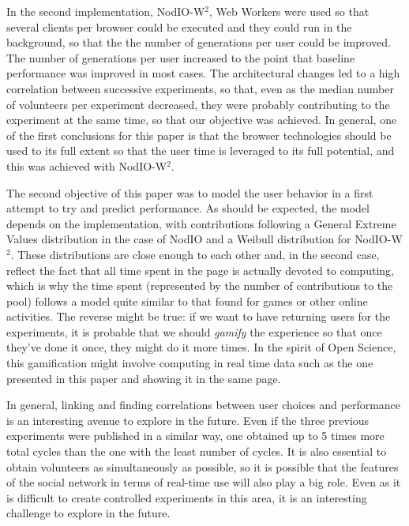 \documentclass[journal,onecolumn]{IEEEtran}
\begin{document}
In the second implementation, {\sf NodIO-W$^2$}, Web Workers
were used so that several clients per browser could be executed and
they could run in the background, so that the the number of
generations per user could be improved. The number of generations per
user increased to the point that baseline performance was improved in
most cases. The architectural changes led to a high correlation
between successive experiments, so that, even as the median number of
volunteers per experiment decreased, they were probably contributing
to the experiment at the same time, so that our objective was
achieved. In general, one of the first conclusions for this paper is
that the browser technologies should be used to its full extent so
that the user time is leveraged to its full potential, and this was
achieved with {\sf NodIO-W$^2$}. 

The second objective of this paper was to model the user behavior in a
first attempt to try and predict performance. As should be expected,
the model depends on the implementation, with contributions following
a General Extreme Values distribution in the case of {\sf NodIO} and a
Weibull distribution for {\sf NodIO-W$^2$}. These distributions are
close enough to each other and, in the second case, reflect the fact
that all time spent in the page is actually devoted to computing,
which is why the time spent (represented by the number of
contributions to the pool) follows a model quite similar to that found
for games or other online activities. The reverse might be true: if we
want to have returning users for the experiments, it is probable that
we should {\em gamify} the experience so that once they've done it
once, they might do it more times. In the spirit of Open Science, this
gamification might involve computing in real time data such as the one
presented in this paper and showing it in the same page. 

In general, linking and finding correlations between user choices and
performance is an interesting avenue to explore in the future. Even if
the three previous experiments were published in a similar way, one
obtained up to 5 times more total cycles  than the one with the least
number of cycles. It is also essential to obtain volunteers as
simultaneously as possible, so it is possible that the features of the
social network in terms of real-time use will also play a big
role. Even as it is difficult to create controlled experiments in this
area, it is an interesting challenge to explore in the future.
\end{document}
